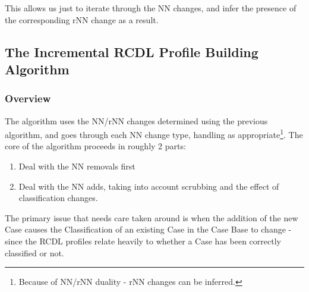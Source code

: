 \documentclass[a4paper,11pt]{report}
\begin{document}
This allows us just to iterate through the NN changes, and infer the presence of the corresponding rNN change as a result.

\subsection{The Incremental RCDL Profile Building Algorithm}
\begin{samepage}
\subsubsection{Overview}
The algorithm uses the NN/rNN changes determined using the previous algorithm, and goes through each NN change type, handling as appropriate\footnote{Because of NN/rNN duality - rNN changes can be inferred.}. The core of the algorithm proceeds in roughly 2 parts:
\begin{enumerate}
	\item Deal with the NN removals first
	\item Deal with the NN adds, taking into account scrubbing and the effect of classification changes.
\end{enumerate}

The primary issue that needs care taken around is when the addition of the new Case causes the Classification of an existing Case in the Case Base to change - since the RCDL profiles relate heavily to whether a Case has been correctly classified or not.


\end{samepage}
\end{document}
